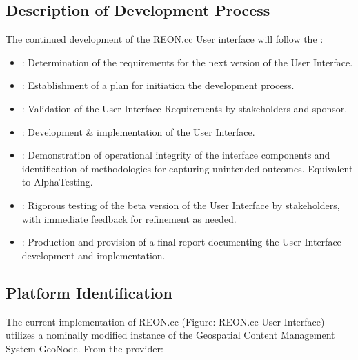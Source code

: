 \documentclass[letterpaper,12pt,english]{book}
\begin{document}
\subsection{Description of Development Process}
\label{\detokenize{requirements/process/index:description-of-development-process}}\label{\detokenize{requirements/process/index::doc}}
\sphinxAtStartPar
The continued development of the REON.cc User interface will follow the
:
\begin{itemize}
\item {} 
\sphinxAtStartPar
{}: Determination of the requirements for the next version of the User Interface.

\item {} 
\sphinxAtStartPar
{}: Establishment of a plan for initiation the development process.

\item {} 
\sphinxAtStartPar
{}: Validation of the User Interface Requirements by stakeholders and sponsor.

\item {} 
\sphinxAtStartPar
{}: Development \& implementation of the User Interface.

\item {} 
\sphinxAtStartPar
{}: Demonstration of operational integrity of the interface components and identification of methodologies for capturing un\sphinxhyphen{}intended outcomes. Equivalent to Alpha\sphinxhyphen{}Testing.

\item {} 
\sphinxAtStartPar
{}: Rigorous testing of the beta version of the User Interface by stakeholders, with immediate feedback for refinement as needed.

\item {} 
\sphinxAtStartPar
{}: Production and provision of a final report documenting the User Interface development and implementation.

\end{itemize}


\subsection{Platform Identification}
\label{\detokenize{requirements/platform/index:platform-identification}}\label{\detokenize{requirements/platform/index::doc}}
\sphinxAtStartPar
The current implementation of REON.cc (Figure: REON.cc User Interface) utilizes a nominally modified instance of the  Geospatial Content Management System GeoNode. From the provider:
\end{document}
